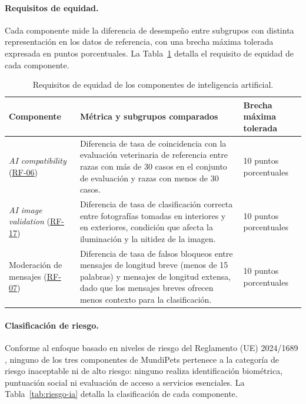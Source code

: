 \documentclass[journal,onecolumn]{IEEEtran}
\begin{document}
\paragraph{Requisitos de equidad.}
Cada componente mide la diferencia de desempeño entre subgrupos con
distinta representación en los datos de referencia, con una brecha máxima
tolerada expresada en puntos porcentuales. La Tabla~\ref{tab:equidad-ia}
detalla el requisito de equidad de cada componente.

\begin{table}[H]
	\centering
	\caption{Requisitos de equidad de los componentes de inteligencia artificial.}
	\label{tab:equidad-ia}
	\small
	\begin{tabularx}{\textwidth}{@{}p{2.3cm} X p{2.6cm}@{}}
		\toprule
		\textbf{Componente} & \textbf{Métrica y subgrupos comparados} & \textbf{Brecha máxima tolerada} \\
		\midrule
		\emph{AI compatibility} (\hyperref[tab:RF-06]{RF-06}) & Diferencia de tasa de coincidencia con la evaluación veterinaria de referencia entre razas con más de 30 casos en el conjunto de evaluación y razas con menos de 30 casos. & 10 puntos porcentuales \\
		\addlinespace
		\emph{AI image validation} (\hyperref[tab:RF-17]{RF-17}) & Diferencia de tasa de clasificación correcta entre fotografías tomadas en interiores y en exteriores, condición que afecta la iluminación y la nitidez de la imagen. & 10 puntos porcentuales \\
		\addlinespace
		Moderación de mensajes (\hyperref[tab:RF-07]{RF-07}) & Diferencia de tasa de falsos bloqueos entre mensajes de longitud breve (menos de 15 palabras) y mensajes de longitud extensa, dado que los mensajes breves ofrecen menos contexto para la clasificación. & 10 puntos porcentuales \\
		\bottomrule
	\end{tabularx}
\end{table}

\paragraph{Clasificación de riesgo.}
Conforme al enfoque basado en niveles de riesgo del Reglamento (UE)
2024/1689 \cite{euaiact2024}, ninguno de los tres componentes de MundiPets
pertenece a la categoría de riesgo inaceptable ni de alto riesgo: ninguno
realiza identificación biométrica, puntuación social ni evaluación de
acceso a servicios esenciales. La Tabla~\ref{tab:riesgo-ia} detalla la
clasificación de cada componente.
\end{document}
